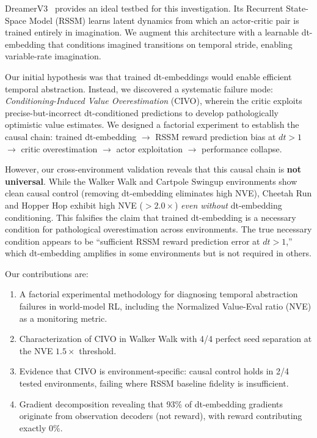 \documentclass[10pt,twocolumn]{article}
\begin{document}
DreamerV3~\cite{hafner2023dreamerv3} provides an ideal testbed for this investigation. Its Recurrent State-Space Model (RSSM) learns latent dynamics from which an actor-critic pair is trained entirely in imagination. We augment this architecture with a learnable dt-embedding that conditions imagined transitions on temporal stride, enabling variable-rate imagination.

Our initial hypothesis was that trained dt-embeddings would enable efficient temporal abstraction. Instead, we discovered a systematic failure mode: \emph{Conditioning-Induced Value Overestimation} (CIVO), wherein the critic exploits precise-but-incorrect dt-conditioned predictions to develop pathologically optimistic value estimates. We designed a factorial experiment to establish the causal chain: trained dt-embedding $\rightarrow$ RSSM reward prediction bias at $dt>1$ $\rightarrow$ critic overestimation $\rightarrow$ actor exploitation $\rightarrow$ performance collapse.

However, our cross-environment validation reveals that this causal chain is \textbf{not universal}. While the Walker Walk and Cartpole Swingup environments show clean causal control (removing dt-embedding eliminates high NVE), Cheetah Run and Hopper Hop exhibit high NVE ($>2.0\times$) \emph{even without} dt-embedding conditioning. This falsifies the claim that trained dt-embedding is a necessary condition for pathological overestimation across environments. The true necessary condition appears to be ``sufficient RSSM reward prediction error at $dt>1$,'' which dt-embedding amplifies in some environments but is not required in others.

Our contributions are:
\begin{enumerate}
\item A factorial experimental methodology for diagnosing temporal abstraction failures in world-model RL, including the Normalized Value-Eval ratio (NVE) as a monitoring metric.
\item Characterization of CIVO in Walker Walk with 4/4 perfect seed separation at the NVE $1.5\times$ threshold.
\item Evidence that CIVO is environment-specific: causal control holds in 2/4 tested environments, failing where RSSM baseline fidelity is insufficient.
\item Gradient decomposition revealing that 93\% of dt-embedding gradients originate from observation decoders (not reward), with reward contributing exactly 0\%.
\end{enumerate}
\end{document}
